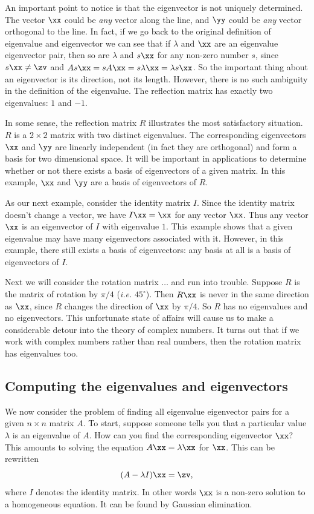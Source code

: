 An important point to notice is that the eigenvector is not uniquely
determined.  The vector $\xx$ could be {\it any} vector along the
line, and $\yy$ could be {\it any} vector orthogonal to the line. In
fact, if we go back to the original definition of eigenvalue and
eigenvector we can see that if $\lambda$ and $\xx$ are an eigenvalue
eigenvector pair, then so are $\lambda$ and $s\xx$ for any non-zero
number $s$, since $s\xx\ne\zv$ and $As\xx=sA\xx=s\lambda \xx =\lambda
s\xx$. So the important thing about an eigenvector is its direction,
not its length. However, there is no such ambiguity in the definition
of the eigenvalue. The reflection matrix has exactly two eigenvalues:
$1$ and $-1$.

In some sense, the reflection matrix $R$ illustrates the most
satisfactory situation. $R$ is a $2\times 2$ matrix with two distinct
eigenvalues. The corresponding eigenvectors $\xx$ and $\yy$ are
linearly independent (in fact they are orthogonal) and form a basis
for two dimensional space.  It will be important in applications to
determine whether or not there exists a basis of eigenvectors of a
given matrix. In this example, $\xx$ and $\yy$ are a basis of
eigenvectors of $R$.

As our next example, consider the identity matrix $I$. Since the
identity matrix doesn't change a vector, we have $I\xx=\xx$ for any
vector $\xx$.  Thus any vector $\xx$ is an eigenvector of $I$ with
eigenvalue $1$.  This example shows that a given eigenvalue may have
many eigenvectors associated with it. However, in this example, there
still exists a basis of eigenvectors: any basis at all is a basis of
eigenvectors of $I$.

Next we will consider the rotation matrix $\ldots$ and run into
trouble. Suppose $R$ is the matrix of rotation by $\pi/4$ ({\em i.e.}
$45^\circ$). Then $R\xx$ is never in the same direction as $\xx$,
since $R$ changes the direction of $\xx$ by $\pi/4$. So $R$ has no
eigenvalues and no eigenvectors. This unfortunate state of affairs
will cause us to make a considerable detour into the theory of complex
numbers. It turns out that if we work with complex numbers rather than
real numbers, then the rotation matrix has eigenvalues too.

\subsection{Computing the eigenvalues and eigenvectors}

We now consider the problem of finding all eigenvalue eigenvector
pairs for a given $n\times n$ matrix $A$. To start, suppose someone
tells you that a particular value $\lambda$ is an eigenvalue of
$A$. How can you find the corresponding eigenvector $\xx$?  This
amounts to solving the equation $A\xx=\lambda\xx$ for $\xx$. This can
be rewritten
\[
(A-\lambda I)\xx = \zv,
\]
where $I$ denotes the identity matrix. In other words $\xx$ is a
non-zero solution to a homogeneous equation. It can be found by
Gaussian elimination.


